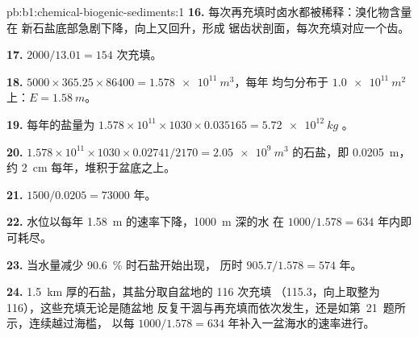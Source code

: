 \begin{solution}{pb:b1:chemical-biogenic-sediments:1}
\textbf{16.} 每次再充填时卤水都被稀释：溴化物含量在
新石盐底部急剧下降，向上又回升，形成
锯齿状剖面，每次充填对应一个齿。

\textbf{17.} $2000/13.01 = 154$ 次充填。

\textbf{18.} $5000\times365.25\times86400 = \qty{1.578e11}{m^3}$，每年
均匀分布于 $\qty{1.0e11}{m^2}$ 上：$E = \qty{1.58}{m}$。

\textbf{19.} 每年的盐量为 $1.578\times10^{11}\times1030\times0.035165 = \qty{5.72e12}{kg}$
。

\textbf{20.} $1.578\times10^{11}\times1030\times0.02741/2170 =
\qty{2.05e9}{m^3}$ 的石盐，即 \qty{0.0205}{m}，约 \qty{2}{cm}
每年，堆积于盆底之上。

\textbf{21.} $1500/0.0205 = \num{73000}$ 年。

\textbf{22.} 水位以每年 \qty{1.58}{m} 的速率下降，\qty{1000}{m} 深的水
在 $1000/1.578 = 634$ 年内即可耗尽。

\textbf{23.} 当水量减少 \qty{90.6}{\%} 时石盐开始出现，
历时 $905.7/1.578 = 574$ 年。

\textbf{24.} \qty{1.5}{km} 厚的石盐，其盐分取自盆地的 116 次充填
（115.3，向上取整为 116），这些充填无论是随盆地
反复干涸与再充填而依次发生，还是如第~21~题所示，连续越过海槛，
以每
$1000/1.578 = 634$ 年补入一盆海水的速率进行。
\end{solution}
